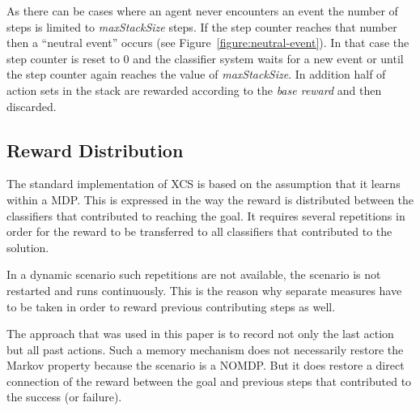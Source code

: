 
As there can be cases where an agent never encounters an event the number of steps is limited to \emph{maxStackSize} steps. If the step counter reaches that number then a ``neutral event'' occurs (see Figure~\ref{figure:neutral-event}). In that case the step counter is reset to $0$ and the classifier system waits for a new event or until the step counter again reaches the value of \emph{maxStackSize}. In addition half of action sets in the stack are rewarded according to the \emph{base reward} and then discarded.


\subsection{Reward Distribution}
\label{subsection:reward-distribution}

The standard implementation of XCS is based on the assumption that it learns within a MDP. This is expressed in the way the reward is distributed between the classifiers that contributed to reaching the goal. It requires several repetitions in order for the reward to be transferred to all classifiers that contributed to the solution.

In a dynamic scenario such repetitions are not available, the scenario is not restarted and runs continuously. This is the reason why separate measures have to be taken in order to reward previous contributing steps as well.

The approach that was used in this paper is to record not only the last action but all past actions. Such a memory mechanism does not necessarily restore the Markov property because the scenario is a NOMDP. But it does restore a direct connection of the reward between the goal and previous steps that contributed to the success (or failure).

